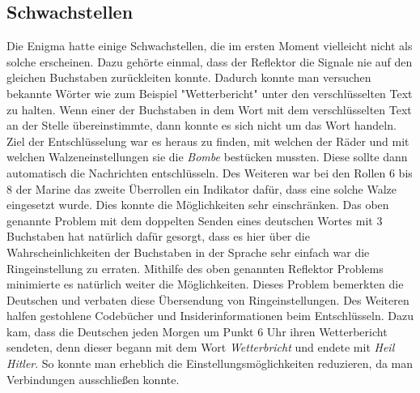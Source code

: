 \subsection{Schwachstellen}
Die Enigma hatte einige Schwachstellen, die im ersten Moment vielleicht nicht als solche erscheinen. Dazu gehörte einmal, dass der Reflektor die Signale nie auf den gleichen Buchstaben zurückleiten konnte. Dadurch konnte man versuchen bekannte Wörter wie zum Beispiel "Wetterbericht" unter den verschlüsselten Text zu halten. Wenn einer der Buchstaben in dem Wort mit dem verschlüsselten Text an der Stelle übereinstimmte, dann konnte es sich nicht um das Wort handeln. Ziel der Entschlüsselung war es heraus zu finden, mit welchen der Räder und mit welchen Walzeneinstellungen sie die \emph{Bombe} bestücken mussten. Diese sollte dann automatisch die Nachrichten entschlüsseln. Des Weiteren war bei den Rollen 6 bis 8 der Marine das zweite Überrollen ein Indikator dafür, dass eine solche Walze eingesetzt wurde. Dies konnte die Möglichkeiten sehr einschränken. Das oben genannte Problem mit dem doppelten Senden eines deutschen Wortes mit 3 Buchstaben hat natürlich dafür gesorgt, dass es hier über die Wahrscheinlichkeiten der Buchstaben in der Sprache sehr einfach war die Ringeinstellung zu erraten. Mithilfe des oben genannten Reflektor Problems minimierte es natürlich weiter die Möglichkeiten. Dieses Problem bemerkten die Deutschen und verbaten diese Übersendung von Ringeinstellungen. Des Weiteren halfen gestohlene Codebücher und Insiderinformationen beim Entschlüsseln. Dazu kam, dass die Deutschen jeden Morgen um Punkt 6 Uhr ihren Wetterbericht sendeten, denn dieser begann mit dem Wort \emph{Wetterbricht} und endete mit \emph{Heil Hitler}. So konnte man erheblich die Einstellungsmöglichkeiten reduzieren, da man Verbindungen ausschließen konnte. \cite{enigmaflaw} \cite{enigmaproblem1}

